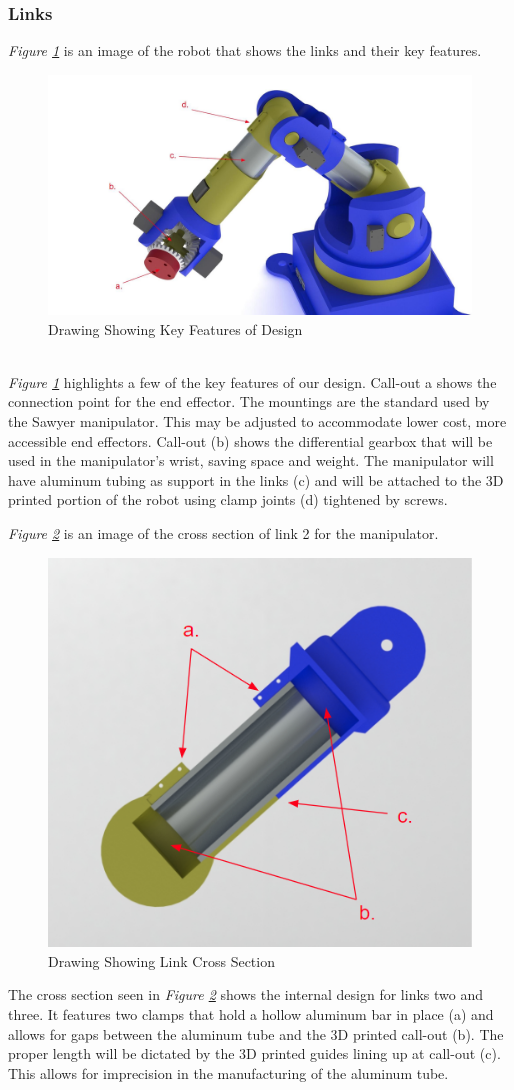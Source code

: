 \documentclass[12pt]{report}
\begin{document}
\subsubsection{Links}
\emph{Figure \ref{fig:link1}} is an image of the robot that shows the links and their key features.\\
\begin{figure}[htp]
  \centering
  \includegraphics[frame,width=.63\textwidth]{link_callouts}
  \caption{Drawing Showing Key Features of Design}
  \label{fig:link1}
\end{figure} \\
\emph{Figure \ref{fig:link1}} highlights a few of the key features of our design. Call-out a shows the connection point for the end effector. The mountings are the standard used by the Sawyer manipulator. This may be adjusted to accommodate lower cost, more accessible end effectors. Call-out (b) shows the differential gearbox that will be used in the manipulator’s wrist, saving space and weight. The manipulator will have aluminum tubing as support in the links (c) and will be attached to the 3D printed portion of the robot using clamp joints (d) tightened by screws.

\emph{Figure \ref{fig:link2}} is an image of the cross section of link 2 for the manipulator.
\begin{figure}[htp]
  \centering
  \includegraphics[frame,width=.35\textwidth]{link_cross_section}
  \caption{Drawing Showing Link Cross Section}
  \label{fig:link2}
\end{figure}

The cross section seen in \emph{Figure \ref{fig:link2}} shows the internal design for links two and three. It features two clamps that hold a hollow aluminum bar in place (a) and allows for gaps between the aluminum tube and the 3D printed call-out (b). The proper length will be dictated by the 3D printed guides lining up at call-out (c). This allows for imprecision in the manufacturing of the aluminum tube.
\end{document}
